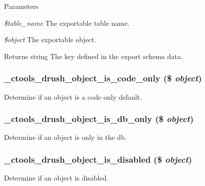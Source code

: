 \begin{DoxyParams}{Parameters}
\item[{\em \$table\_\-name}]The exportable table name. \item[{\em \$object}]The exportable object.\end{DoxyParams}
\begin{DoxyReturn}{Returns}
string The key defined in the export schema data. 
\end{DoxyReturn}
\hypertarget{ctools_8drush_8inc_a991c0c74a1fbc625ea24e0a1c94ef79a}{
\subsubsection[{\_\-ctools\_\-drush\_\-object\_\-is\_\-code\_\-only}]{\setlength{\rightskip}{0pt plus 5cm}\_\-ctools\_\-drush\_\-object\_\-is\_\-code\_\-only (\$ {\em object})}}
\label{ctools_8drush_8inc_a991c0c74a1fbc625ea24e0a1c94ef79a}
Determine if an object is a code only default. \hypertarget{ctools_8drush_8inc_a63cc2c859d1a8e4b2a217ea60444e60c}{
\subsubsection[{\_\-ctools\_\-drush\_\-object\_\-is\_\-db\_\-only}]{\setlength{\rightskip}{0pt plus 5cm}\_\-ctools\_\-drush\_\-object\_\-is\_\-db\_\-only (\$ {\em object})}}
\label{ctools_8drush_8inc_a63cc2c859d1a8e4b2a217ea60444e60c}
Determine if an object is only in the db. \hypertarget{ctools_8drush_8inc_a6f6ccf63b028f6ea83854ca77cf2f5b3}{
\subsubsection[{\_\-ctools\_\-drush\_\-object\_\-is\_\-disabled}]{\setlength{\rightskip}{0pt plus 5cm}\_\-ctools\_\-drush\_\-object\_\-is\_\-disabled (\$ {\em object})}}
\label{ctools_8drush_8inc_a6f6ccf63b028f6ea83854ca77cf2f5b3}
Determine if an object is disabled.


